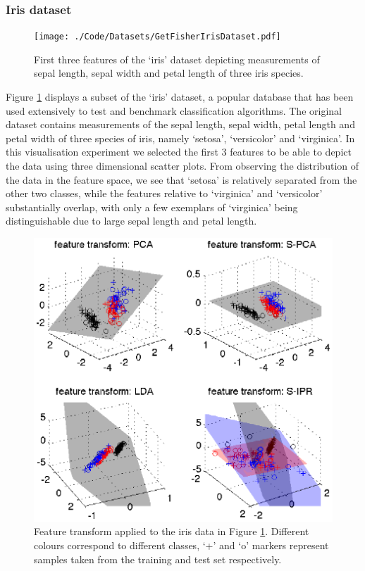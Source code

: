\documentclass{article}
\begin{document}
\subsubsection{Iris dataset}
\begin{figure}
\centering
\texttt{[image: ./Code/Datasets/GetFisherIrisDataset.pdf]}
\caption{\label{fig:fisher3} First three features of the `iris' dataset depicting measurements of sepal length, sepal width and petal length of three iris species.}
\end{figure}
Figure \ref{fig:fisher3} displays a subset of the `iris' dataset, a popular database that has been used extensively to test and benchmark classification algorithms. The original dataset contains measurements of the sepal length, sepal width, petal length and petal width of three species of iris, namely `setosa', `versicolor' and `virginica'. In this visualisation experiment we selected the first $3$ features to be able to depict the data using three dimensional scatter plots. From observing the distribution of the data in the feature space, we see that `setosa' is relatively separated from the other two classes, while the features relative to `virginica' and `versicolor' substantially overlap, with only a few exemplars of `virginica' being distinguishable due to large sepal length and petal length.
\begin{figure}
\includegraphics[width=\textwidth]{./Code/fishervisu.eps}
\caption{\label{fig:fisher3NewFea}Feature transform applied to the iris data in Figure \ref{fig:fisher3}. Different colours correspond to different classes, `+' and `o' markers represent samples taken from the training and test set respectively.}
\end{figure}
\end{document}
